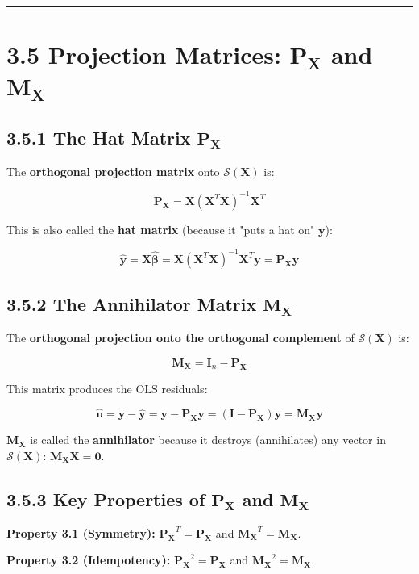 \medskip\hrule\medskip

\section{3.5 Projection Matrices: $\mathbf{P_X}$ and $\mathbf{M_X}$}

\subsection{3.5.1 The Hat Matrix $\mathbf{P_X}$}

The \textbf{orthogonal projection matrix} onto $\mathcal{S}(\mathbf{X})$ is:

\[
\mathbf{P_X} = \mathbf{X}(\mathbf{X}^T \mathbf{X})^{-1} \mathbf{X}^T
\]

This is also called the \textbf{hat matrix} (because it "puts a hat on" $\mathbf{y}$):

\[
\hat{\mathbf{y}} = \mathbf{X}\hat{\boldsymbol{\beta}} = \mathbf{X}(\mathbf{X}^T\mathbf{X})^{-1}\mathbf{X}^T \mathbf{y} = \mathbf{P_X} \mathbf{y}
\]

\subsection{3.5.2 The Annihilator Matrix $\mathbf{M_X}$}

The \textbf{orthogonal projection onto the orthogonal complement} of $\mathcal{S}(\mathbf{X})$ is:

\[
\mathbf{M_X} = \mathbf{I}_n - \mathbf{P_X}
\]

This matrix produces the OLS residuals:

\[
\hat{\mathbf{u}} = \mathbf{y} - \hat{\mathbf{y}} = \mathbf{y} - \mathbf{P_X}\mathbf{y} = (\mathbf{I} - \mathbf{P_X})\mathbf{y} = \mathbf{M_X}\mathbf{y}
\]

$\mathbf{M_X}$ is called the \textbf{annihilator} because it destroys (annihilates) any vector in $\mathcal{S}(\mathbf{X})$: $\mathbf{M_X}\mathbf{X} = \mathbf{0}$.

\subsection{3.5.3 Key Properties of $\mathbf{P_X}$ and $\mathbf{M_X}$}

\textbf{Property 3.1 (Symmetry):} $\mathbf{P_X}^T = \mathbf{P_X}$ and $\mathbf{M_X}^T = \mathbf{M_X}$.

\textbf{Property 3.2 (Idempotency):} $\mathbf{P_X}^2 = \mathbf{P_X}$ and $\mathbf{M_X}^2 = \mathbf{M_X}$.

